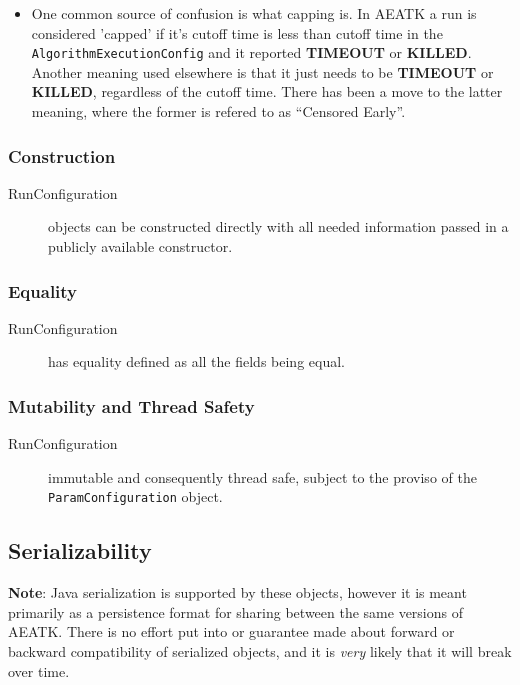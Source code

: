\documentclass[11pt,letterpaper,oneside]{article}
\begin{document}
\begin{itemize}
\item One common source of confusion is what capping is. In AEATK a run is considered 'capped' if it's cutoff time is less than cutoff time in the \texttt{AlgorithmExecutionConfig} and it reported \textbf{TIMEOUT} or \textbf{KILLED}. Another meaning used elsewhere is that it just needs to be \textbf{TIMEOUT} or \textbf{KILLED}, regardless of the cutoff time. There has been a move to the latter meaning, where the former is refered to as ``Censored Early''.
\end{itemize}

\subsubsection{Construction}
\begin{description}
\item[RunConfiguration] objects can be constructed directly with all needed information passed in a publicly available constructor.
\end{description}


\subsubsection{Equality}
\begin{description}
\item[RunConfiguration] has equality defined as all the fields being equal.
\end{description}

\subsubsection{Mutability and Thread Safety}
\begin{description}
\item[RunConfiguration] immutable and consequently thread safe, subject to the proviso of the \texttt{ParamConfiguration} object.
\end{description}

\subsection{Serializability}

\textbf{Note}: Java serialization is supported by these objects, however it is meant primarily as a persistence format for sharing between the same versions of AEATK. There is no effort put into or guarantee made about forward or backward compatibility of serialized objects, and it is \emph{very} likely that it will break over time.
\end{document}
